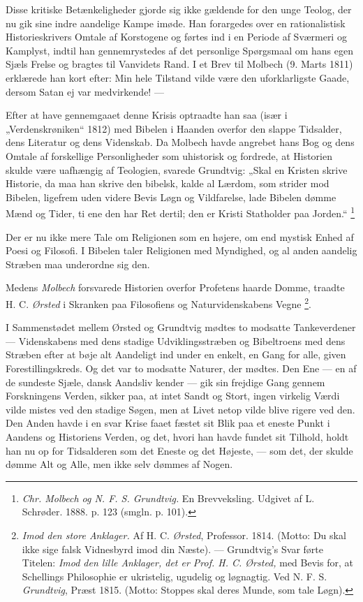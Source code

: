 \documentclass[12pt,a4paper,openany]{book}
\newcommand{\opage}[1]{\marginnote{\footnotesize\textit{[#1]}}}
\begin{document}
Disse kritiske Betænkeligheder gjorde sig ikke gældende for den unge Teolog,
der nu gik sine indre aandelige Kampe imøde. Han forargedes over en
rationalistisk Historieskrivers Omtale af Korstogene og førtes ind i en Periode
af Sværmeri og Kamplyst, indtil han gennemrystedes af det personlige Spørgsmaal
om hans egen Sjæls Frelse og bragtes til Vanvidets Rand. I et Brev til Molbech
(9. Marts 1811) erklærede han kort efter: Min hele Tilstand vilde være den
uforklarligste Gaade, dersom Satan ej var medvirkende! ---

Efter at have gennemgaaet denne Krisis optraadte han saa (især i
„Verdenskrøniken“ 1812) med Bibelen i Haanden overfor den slappe Tidsalder,
dens Literatur og dens Videnskab. Da Molbech havde angrebet hans Bog og dens
Omtale af forskellige Personligheder som uhistorisk og fordrede, at Historien
skulde være uafhængig af Teologien, svarede Grundtvig: „Skal en Kristen skrive
Historie, da maa han skrive den bibelsk, kalde al Lærdom, som strider mod
Bibelen, ligefrem uden videre Bevis Løgn og Vildfarelse, lade Bibelen dømme
Mænd og Tider, ti ene den har Ret dertil; den er Kristi Statholder paa Jorden.“%
\footnote[1]{\textit{Chr. Molbech og N. F. S. Grundtvig.} En Brevveksling.
Udgivet af L. Schrøder. 1888. p. 123 (smgln. p. 101).}

\setcounter{footnote}{0}%
\opage{61}Der er nu ikke mere Tale om Religionen som en højere, om end mystisk
Enhed af Poesi og Filosofi. I Bibelen taler Religionen med Myndighed, og al
anden aandelig Stræben maa underordne sig den.

Medens \emph{Molbech} forsvarede Historien overfor Profetens haarde Domme,
traadte H. C. \emph{Ørsted} i Skranken paa Filosofiens og Naturvidenskabens Vegne%
\footnote[1]{\textit{Imod den store Anklager.} Af H. C. \emph{Ørsted},
Professor. 1814. (Motto: Du skal ikke sige falsk Vidnesbyrd imod din Næste).
--- Grundtvig's Svar førte Titelen: \textit{Imod den lille Anklager, det er
Prof. H. C. Ørsted,} med Bevis for, at Schellings Philosophie er ukristelig,
ugudelig og løgnagtig. Ved N. F. S. \emph{Grundtvig}, Præst 1815. (Motto:
Stoppes skal deres Munde, som tale Løgn).}.

I Sammenstødet mellem Ørsted og Grundtvig mødtes to modsatte Tankeverdener ---
Videnskabens med dens stadige Udviklingsstræben og Bibeltroens med dens Stræben
efter at bøje alt Aandeligt ind under en enkelt, en Gang for alle, given
Forestillingskreds. Og det var to modsatte Naturer, der mødtes. Den Ene --- en
af de sundeste Sjæle, dansk Aandsliv kender --- gik sin frejdige Gang gennem
Forskningens Verden, sikker paa, at intet Sandt og Stort, ingen virkelig Værdi
vilde mistes ved den stadige Søgen, men at Livet netop vilde blive rigere ved
den. Den Anden havde i en svar Krise faaet fæstet sit Blik paa et eneste Punkt
i Aandens og Historiens Verden, og det, hvori han havde fundet sit Tilhold,
holdt han nu op for Tidsalderen som det Eneste og det Højeste, --- som det, der
skulde dømme Alt og Alle, men ikke selv dømmes af Nogen.
\end{document}
